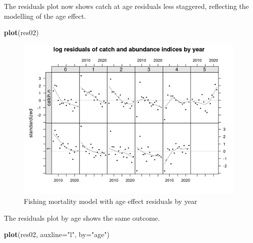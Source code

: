 \documentclass[
]{book}
\newenvironment{Shaded}{\begin{snugshade}}{\end{snugshade}}
\newcommand{\AttributeTok}[1]{\textcolor[rgb]{0.13,0.29,0.53}{#1}}
\newcommand{\FunctionTok}[1]{\textcolor[rgb]{0.13,0.29,0.53}{\textbf{#1}}}
\newcommand{\NormalTok}[1]{#1}
\newcommand{\StringTok}[1]{\textcolor[rgb]{0.31,0.60,0.02}{#1}}
\begin{document}
The residuals plot now shows catch at age residuals less staggered, reflecting the modelling of the age effect.

\begin{Shaded}
\begin{Highlighting}[]
\FunctionTok{plot}\NormalTok{(res02)}
\end{Highlighting}
\end{Shaded}

\begin{figure}
\centering
\includegraphics{_bookdown_files/_main_files/figure-html/fageresbyyear-1.png}
\caption{\label{fig:fageresbyyear}Fishing mortality model with age effect residuals by year}
\end{figure}

The residuals plot by age shows the same outcome.

\begin{Shaded}
\begin{Highlighting}[]
\FunctionTok{plot}\NormalTok{(res02, }\AttributeTok{auxline=}\StringTok{"l"}\NormalTok{, }\AttributeTok{by=}\StringTok{"age"}\NormalTok{)}
\end{Highlighting}
\end{Shaded}
\end{document}
